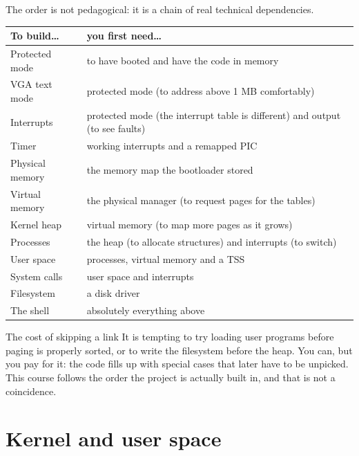 The order is not pedagogical: it is a chain of real technical dependencies.

\begin{center}
\begin{tabularx}{\textwidth}{@{}l X@{}}
\toprule
\textbf{To build\ldots} & \textbf{you first need\ldots} \\
\midrule
Protected mode       & to have booted and have the code in memory \\
VGA text mode        & protected mode (to address above 1 MB comfortably) \\
Interrupts           & protected mode (the interrupt table is different) and output (to see faults) \\
Timer                & working interrupts and a remapped PIC \\
Physical memory      & the memory map the bootloader stored \\
Virtual memory       & the physical manager (to request pages for the tables) \\
Kernel heap          & virtual memory (to map more pages as it grows) \\
Processes            & the heap (to allocate structures) and interrupts (to switch) \\
User space           & processes, virtual memory and a TSS \\
System calls         & user space and interrupts \\
Filesystem           & a disk driver \\
The shell            & absolutely everything above \\
\bottomrule
\end{tabularx}
\end{center}

\begin{warn}{The cost of skipping a link}
It is tempting to try loading user programs before paging is properly sorted, or to write the
filesystem before the heap. You can, but you pay for it: the code fills up with special cases that
later have to be unpicked. This course follows the order the project is actually built in, and
that is not a coincidence.
\end{warn}

\chapter{Kernel and user space}

